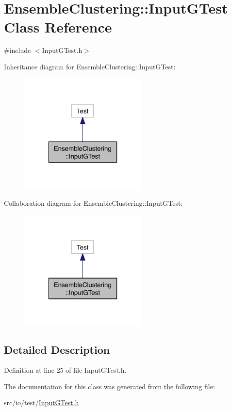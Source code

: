 \hypertarget{class_ensemble_clustering_1_1_input_g_test}{\section{Ensemble\-Clustering\-:\-:Input\-G\-Test Class Reference}
\label{class_ensemble_clustering_1_1_input_g_test}
}


{\ttfamily \#include $<$Input\-G\-Test.\-h$>$}



Inheritance diagram for Ensemble\-Clustering\-:\-:Input\-G\-Test\-:\nopagebreak
\begin{figure}[H]
\begin{center}
\leavevmode
\includegraphics[width=184pt]{class_ensemble_clustering_1_1_input_g_test__inherit__graph}
\end{center}
\end{figure}


Collaboration diagram for Ensemble\-Clustering\-:\-:Input\-G\-Test\-:\nopagebreak
\begin{figure}[H]
\begin{center}
\leavevmode
\includegraphics[width=184pt]{class_ensemble_clustering_1_1_input_g_test__coll__graph}
\end{center}
\end{figure}


\subsection{Detailed Description}


Definition at line 25 of file Input\-G\-Test.\-h.



The documentation for this class was generated from the following file\-:\begin{DoxyCompactItemize}
\item 
src/io/test/\hyperlink{_input_g_test_8h}{Input\-G\-Test.\-h}\end{DoxyCompactItemize}
